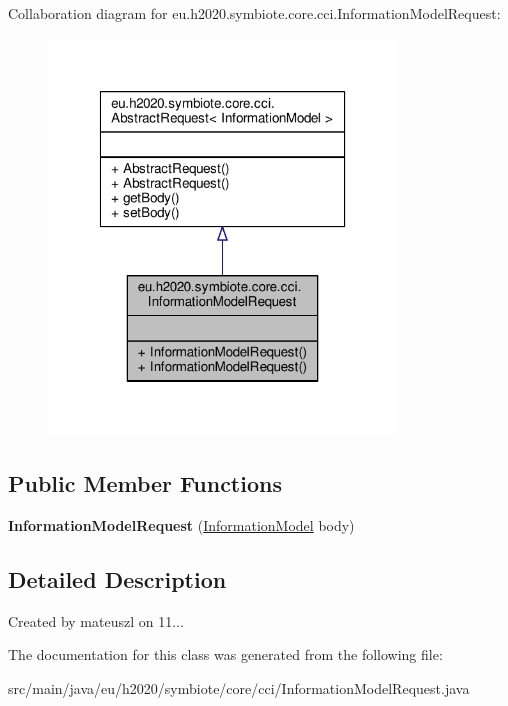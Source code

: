 Collaboration diagram for eu.\+h2020.\+symbiote.\+core.\+cci.\+Information\+Model\+Request\+:
\nopagebreak
\begin{figure}[H]
\begin{center}
\leavevmode
\includegraphics[width=262pt]{classeu_1_1h2020_1_1symbiote_1_1core_1_1cci_1_1InformationModelRequest__coll__graph}
\end{center}
\end{figure}
\subsection*{Public Member Functions}
\begin{DoxyCompactItemize}
\item 
\mbox{\label{classeu_1_1h2020_1_1symbiote_1_1core_1_1cci_1_1InformationModelRequest_aa961d62ac6990fbeb92c159a175feb70}} 
{\bfseries Information\+Model\+Request} (\hyperlink{classeu_1_1h2020_1_1symbiote_1_1model_1_1mim_1_1InformationModel}{Information\+Model} body)
\end{DoxyCompactItemize}


\subsection{Detailed Description}
Created by mateuszl on 11... 

The documentation for this class was generated from the following file\+:\begin{DoxyCompactItemize}
\item 
src/main/java/eu/h2020/symbiote/core/cci/Information\+Model\+Request.\+java\end{DoxyCompactItemize}
